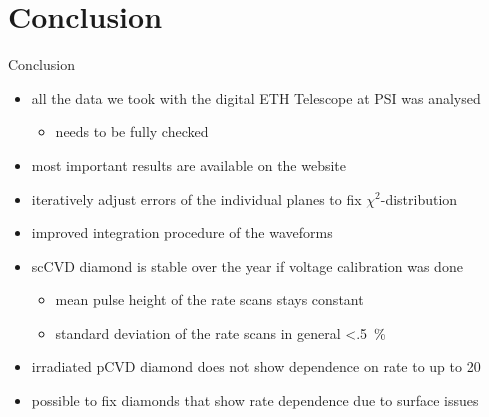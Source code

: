 \section{Conclusion}
\begin{frame}{Conclusion}

	\begin{minipage}[c][6cm]{\textwidth}
		\begin{itemize}\itemfill
			\item all the data we took with the digital ETH Telescope at PSI was analysed
			\begin{itemize}
				\item needs to be fully checked
			\end{itemize}
			\item most important results are available on the website
			\item iteratively adjust errors of the individual planes to fix $\chi^2$-distribution
			\item improved integration procedure of the waveforms
			\item scCVD diamond is stable over the year if voltage calibration was done
			\begin{itemize}
				\item mean pulse height of the rate scans stays constant
				\item standard deviation of the rate scans in general \SI{<.5}{\%}
			\end{itemize}
			\item irradiated pCVD diamond does not show dependence on rate to  up to \SI{20}{\mhzcm}
			\item possible to fix diamonds that show rate dependence due to surface issues
		\end{itemize}
	\end{minipage}
	
\end{frame}
